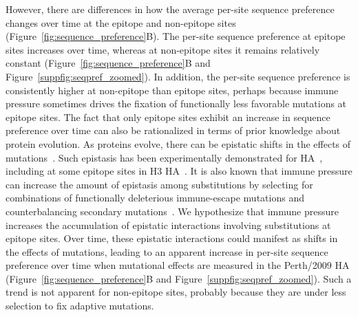 \documentclass[9pt,twocolumn,twoside]{pnas-new}
\begin{document}
However, there are differences in how the average per-site sequence preference changes over time at the epitope and non-epitope sites (Figure~\ref{fig:sequence_preference}B).
The per-site sequence preference at epitope sites increases over time, whereas at non-epitope sites it remains relatively constant  (Figure~\ref{fig:sequence_preference}B and Figure~\ref{suppfig:seqpref_zoomed}).
In addition, the per-site sequence preference is consistently higher at non-epitope than epitope sites, perhaps because immune pressure sometimes drives the fixation of functionally less favorable mutations at epitope sites.
The fact that only epitope sites exhibit an increase in sequence preference over time can also be rationalized in terms of prior knowledge about protein evolution.
As proteins evolve, there can be epistatic shifts in the effects of mutations~\cite{gong2013stability,natarajan2013epistasis,harms2014historical,starr2016epistasis,starr2017alternative,haddox2017mapping}.
Such epistasis has been experimentally demonstrated for HA~\cite{das2013defining,myers2013compensatory}, including at some epitope sites in H3 HA~\cite{wu2017diversity}.
It is also known that immune pressure can increase the amount of epistasis among substitutions by selecting for combinations of functionally deleterious immune-escape mutations and counterbalancing secondary mutations~\cite{gong2014epistatically}.
We hypothesize that immune pressure increases the accumulation of epistatic interactions involving substitutions at epitope sites.
Over time, these epistatic interactions could manifest as shifts in the effects of mutations, leading to an apparent increase in per-site sequence preference over time when mutational effects are measured in the Perth/2009 HA (Figure~\ref{fig:sequence_preference}B and Figure~\ref{suppfig:seqpref_zoomed}).
Such a trend is not apparent for non-epitope sites, probably because they are under less selection to fix adaptive mutations.
\end{document}
